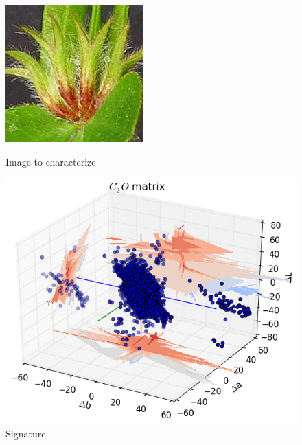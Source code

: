 \documentclass[xcolor=table]{beamer}
\begin{document}
\begin{frame}
\begin{itemize}
 {\begin{figure}[htbp]
    \begin{minipage}[c]{.40\linewidth}
      \begin{center}
    \includegraphics[scale=0.50]{97p.jpg}
    \caption{Image to characterize}
    \label{fig:Sig}
      \end{center}
    \end{minipage}
    \hfill
    \begin{minipage}[c]{.55\linewidth}
      \begin{center}
    \includegraphics[scale=0.38]{C2OMat97p.png}
    \caption{Signature}
    \label{fig:Sig}
      \end{center}
    \end{minipage}
\end{figure}}

\end{itemize}

\end{frame}
\end{document}
